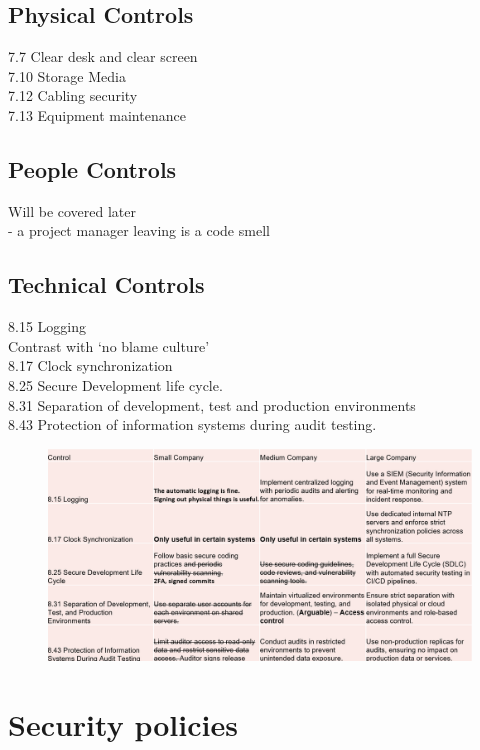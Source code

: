 \documentclass[tikz,border=10pt]{project_plan}
\begin{document}
\subsection{Physical Controls}

7.7 Clear desk and clear screen \\
7.10 Storage Media\\
7.12 Cabling security\\
7.13 Equipment maintenance

\subsection{People Controls}

Will be covered later\\
- a project manager leaving is a code smell

\subsection{Technical Controls}

8.15 Logging\\
Contrast with ‘no blame culture’\\
8.17 Clock synchronization\\
8.25 Secure Development life cycle.\\
8.31 Separation of development, test and production environments \\
8.43 Protection of information systems during audit testing.

\begin{figure}[H]
  \centering
  \includegraphics[width=\linewidth]{technical controls.png}
\end{figure}

\section{Security policies}
\end{document}
